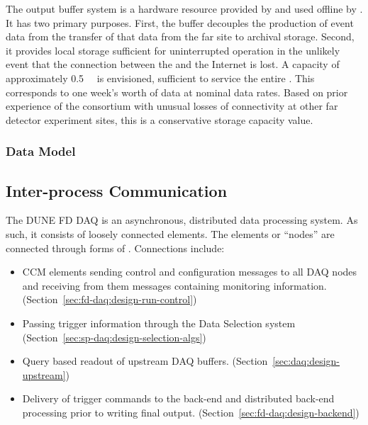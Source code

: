 The output buffer system is a hardware resource provided by  and used offline by . 
It has two primary purposes. 
First, the buffer decouples the production of event data from the transfer of that data from the far site to archival storage.
Second, it provides local storage sufficient for uninterrupted  operation in the unlikely event that the connection between the  and the Internet is lost. 
A capacity of approximately \SI{0.5}{\peta\byte} is envisioned,
sufficient to service the entire . This corresponds to one
week's worth of data at nominal data rates. Based on prior experience
of the consortium with unusual losses of 
connectivity at other far detector experiment sites, this is a
conservative storage capacity value.

\subsubsection{Data Model}
\label{sec:fd-daq:design-data-model}



\subsection{Inter-process Communication}
\label{sec:daq:design-ipc}

The DUNE FD DAQ is an asynchronous, distributed data processing system. 
As such, it consists of loosely connected elements.
The elements or ``nodes'' are connected through forms of .
Connections include:

\begin{itemize}
\item CCM elements sending control and configuration messages to all DAQ nodes and receiving from them messages containing monitoring information.  (Section~\ref{sec:fd-daq:design-run-control})
\item Passing trigger information through the Data Selection system (Section~\ref{sec:sp-daq:design-selection-algs})
\item Query based readout of upstream DAQ buffers. (Section~\ref{sec:daq:design-upstream})
\item Delivery of trigger commands to the back-end and distributed back-end processing prior to writing final output. (Section~\ref{sec:fd-daq:design-backend})
\end{itemize}

